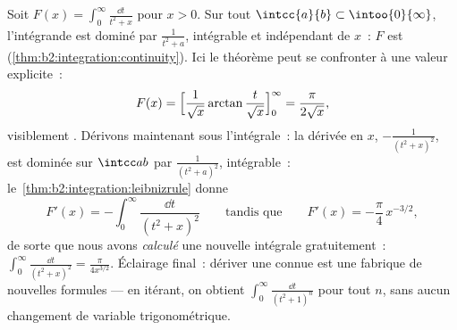\begin{example}\label{ex:b2:integration:arctanparam}
Soit $F(x) = \displaystyle\int_0^\infty \frac{\dd t}{t^2 + x}$
pour $x > 0$. Sur tout $\intcc{a}{b} \subset \intoo{0}{\infty}$,
l'intégrande est dominé par $\frac{1}{t^2 + a}$, intégrable
et indépendant de $x$~: $F$ est 
(\cref{thm:b2:integration:continuity}). Ici le théorème peut se
confronter à une valeur explicite~:
\[
F(x) = \Bigl[\frac{1}{\sqrt x}\arctan\frac{t}{\sqrt
x}\Bigr]_0^\infty = \frac{\pi}{2\sqrt x} ,
\]
visiblement . Dérivons maintenant sous l'intégrale~: la
dérivée en $x$, $-\frac{1}{(t^2+x)^2}$, est dominée sur
$\intcc ab$ par $\frac{1}{(t^2+a)^2}$, intégrable~:
le~\cref{thm:b2:integration:leibnizrule} donne
\[
F'(x) = -\int_0^\infty \frac{\dd t}{(t^2 + x)^2}
\qquad\text{tandis que}\qquad
F'(x) = -\frac{\pi}{4}\,x^{-3/2} ,
\]
de sorte que nous avons \emph{calculé} une nouvelle intégrale gratuitement~:
$\int_0^\infty\frac{\dd t}{(t^2+x)^2} = \frac{\pi}{4x^{3/2}}$.
Éclairage final~: dériver une  connue est une
fabrique de nouvelles formules --- en itérant, on obtient
$\int_0^\infty\frac{\dd t}{(t^2+1)^n}$ pour tout $n$, sans aucun
changement de variable trigonométrique.
\end{example}

